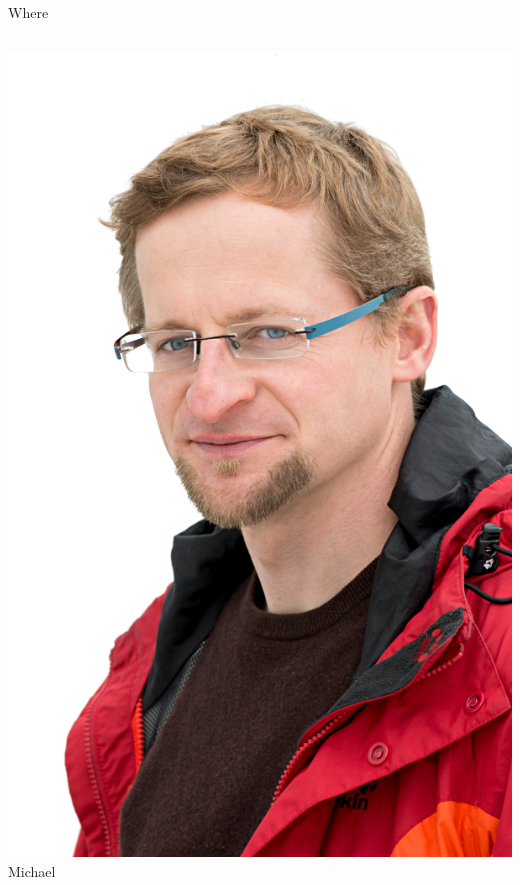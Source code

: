 \documentclass[12pt,table,t]{beamer}
\begin{document}
\begin{frame}{Where}
  \begin{columns}[c]
    \begin{center}
      \includegraphics[width=\linewidth]{figure/michael} \\
      Michael
    \end{center}


\end{columns}
\end{frame}
\end{document}
